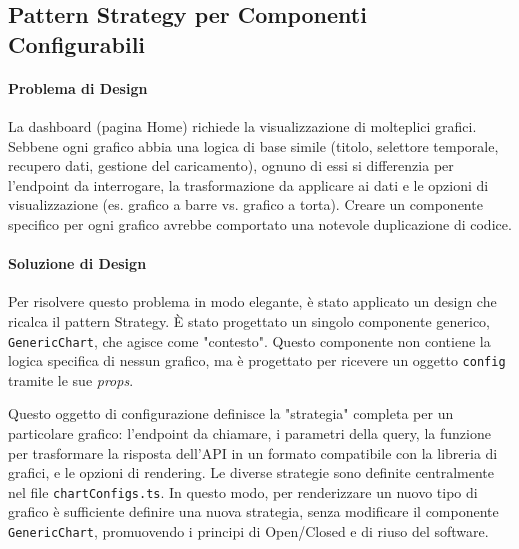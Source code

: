 \documentclass[12pt,a4paper,openright,twoside]{book}
\begin{document}
\subsection{Pattern Strategy per Componenti Configurabili}
\label{subsec:design_strategy_frontend}

\paragraph{Problema di Design}
La dashboard (pagina Home) richiede la visualizzazione di molteplici grafici. Sebbene ogni grafico abbia una logica di base simile (titolo, selettore temporale, recupero dati, gestione del caricamento), ognuno di essi si differenzia per l'endpoint da interrogare, la trasformazione da applicare ai dati e le opzioni di visualizzazione (es. grafico a barre vs. grafico a torta). Creare un componente specifico per ogni grafico avrebbe comportato una notevole duplicazione di codice.

\paragraph{Soluzione di Design}
Per risolvere questo problema in modo elegante, è stato applicato un design che ricalca il pattern Strategy. È stato progettato un singolo componente generico, \texttt{GenericChart}, che agisce come "contesto". Questo componente non contiene la logica specifica di nessun grafico, ma è progettato per ricevere un oggetto \texttt{config} tramite le sue \textit{props}.

Questo oggetto di configurazione definisce la "strategia" completa per un particolare grafico: l'endpoint da chiamare, i parametri della query, la funzione per trasformare la risposta dell'API in un formato compatibile con la libreria di grafici, e le opzioni di rendering. Le diverse strategie sono definite centralmente nel file \texttt{chartConfigs.ts}. In questo modo, per renderizzare un nuovo tipo di grafico è sufficiente definire una nuova strategia, senza modificare il componente \texttt{GenericChart}, promuovendo i principi di Open/Closed e di riuso del software.
\end{document}

